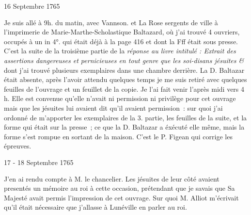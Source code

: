                      \begin{diary}{16 Septembre 1765}{}
                        
                         Je suis allé à 9h. du matin, avec
                              Vannson.
                           et La Rose sergents de ville à
                           l'imprimerie de
                           Marie-Marthe-Scholastique
                              Baltazard, où
                           j'ai trouvé 4 ouvriers, occupés à un in 4°.
                           qui était déjà à la page 416 et dont la
                           Fff était sous
                           presse. C'est la suite de la
                           troisième partie de la \emph{réponse au livre
                              intitulé : \emph{Extrait des assertions dangereuses
                                 et pernicieuses en tout genre que les soi-disans
                                 jésuites &}} dont j'ai trouvé plusieurs exemplaires
                           dans une chambre derrière. La
                                 D. Baltazar
                           était absente, après l'avoir attendu quelques
                           temps je me suis retiré avec quelques feuilles
                           de l'ouvrage et un feuillet de la copie. Je l'ai
                           fait venir l'après midi vers 4 h. Elle est convenue
                           qu'elle n'avait ni permission ni privilège pour
                           cet ouvrage mais que les jésuites lui avaient
                           dit qu'il avaient permission : sur quoi j'ai ordonné de m'apporter les exemplaires de la
                           3. partie, les feuilles de la suite, et la
                           forme qui était sur la presse ; ce que la
                                 D.
                              Baltazar a éxécuté elle même, mais la
                           forme s'est rompue en sortant de la maison.
                           C'est le P. Figean qui corrige
                           les épreuves. \bigskip
        
        
                     \end{diary}

                     \begin{diary}{17 - 18 Septembre 1765}{}
                        
                         J'en ai rendu compte à M. le chancelier.
                           Les jésuites de leur côté avaient presentés un
                           mémoire au roi à cette
                           occasion, prétendant
                           que je savais que Sa Majesté avait permis l'impression
                           de cet ouvrage. Sur quoi M.
                              Alliot m'écrivait
                           qu'il était nécessaire que j'allasse à Lunéville
                           en parler au roi. \bigskip
        
        
                     \end{diary}

